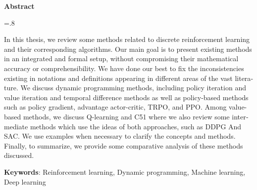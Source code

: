 


\pagestyle{empty}

\begin{latin}

\begin{center}
\textbf{Abstract}
\end{center}
\baselineskip=.8\baselineskip

In this thesis, we review some methods related to discrete reinforcement learning and their corresponding algorithms.		
Our main goal is to present existing methods in an integrated and formal setup, without compromising their mathematical accuracy or comprehensibility.
We have done our best to fix the inconsistencies existing in notations and definitions appearing in different areas of the vast literature.
We discuss dynamic programming methods, including policy iteration and value iteration and temporal difference methods as well as policy-based methods such as policy gradient, advantage actor-critic, TRPO, and PPO. Among value-based methods, we discuss Q-learning and C51 where we also review some intermediate methods which use the ideas of both approaches, such as DDPG And SAC. We use examples when necessary to clarify the concepts and methods. Finally, to summarize, we provide some comparative analysis of these methods discussed.

\bigskip\noindent\textbf{Keywords}:
Reinforcement learning, Dynamic programming, Machine learning, Deep learning

\end{latin}

\newpage
